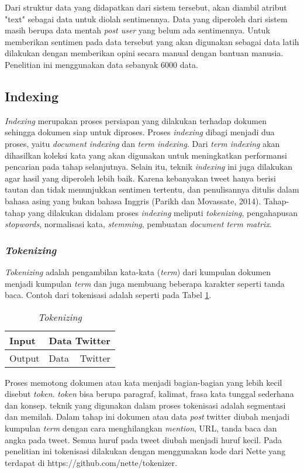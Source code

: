 Dari struktur data yang didapatkan dari sistem tersebut, akan diambil atribut "text" sebagai data untuk diolah sentimennya. Data yang diperoleh dari sistem masih berupa data mentah \textit{post user} yang belum ada sentimennya. Untuk memberikan sentimen pada data tersebut yang akan digunakan sebagai data latih dilakukan dengan memberikan opini secara manual dengan bantuan manusia. Penelitian ini menggunakan data sebanyak 6000 data.


\subsection*{Indexing}

\textit{Indexing} merupakan proses persiapan yang dilakukan terhadap dokumen sehingga dokumen siap untuk diproses. Proses \textit{indexing} dibagi menjadi dua proses, yaitu \textit{document indexing} dan \textit{term indexing}. Dari \textit{term indexing} akan dihasilkan koleksi kata yang akan digunakan untuk meningkatkan performansi pencarian pada tahap selanjutnya.  Selain itu, teknik \textit{indexing} ini juga dilakukan agar hasil yang diperoleh lebih baik. Karena kebanyakan tweet hanya berisi tautan dan tidak menunjukkan sentimen tertentu, dan penulisannya ditulis dalam bahasa asing yang bukan bahasa Inggris (Parikh dan Movassate, 2014). Tahap-tahap yang dilakukan didalam proses \textit{indexing} meliputi \textit{tokenizing}, pengahapusan \textit{stopwords}, normalisasi kata, \textit{stemming}, pembuatan \textit{document term matrix}.


\subsubsection*{\textit{Tokenizing}}
\textit{Tokenizing} adalah pengambilan kata-kata (\textit{term}) dari kumpulan dokumen menjadi kumpulan \textit{term} dan juga membuang beberapa karakter seperti tanda baca. Contoh dari tokenisasi adalah seperti pada Tabel \ref{tab:tokenizing}.

\begin{table}[hbt]
	\caption{\textit{Tokenizing}}
	\centering
	\begin{tabular}{llr}
		\toprule
		Input & \multicolumn{2}{c}{Data Twitter} \\
		\midrule
		Output & Data & Twitter \\
		\bottomrule
	\end{tabular}
	\label{tab:tokenizing}
\end{table}
Proses memotong dokumen atau kata menjadi bagian-bagian yang lebih kecil disebut \textit{token}. \textit{token} bisa berupa paragraf, kalimat, frasa kata tunggal sederhana dan konsep. teknik yang digunakan dalam proses tokenisasi adalah segmentasi dan memilah.
Dalam tahap ini dokumen atau data \textit{post} twitter diubah menjadi kumpulan \textit{term} dengan cara menghilangkan \textit{mention}, URL, tanda baca dan angka pada tweet. Semua huruf pada tweet diubah menjadi huruf kecil. Pada penelitian ini tokenisasi dilakukan dengan menggunakan kode dari Nette yang terdapat di https://github.com/nette/tokenizer.



